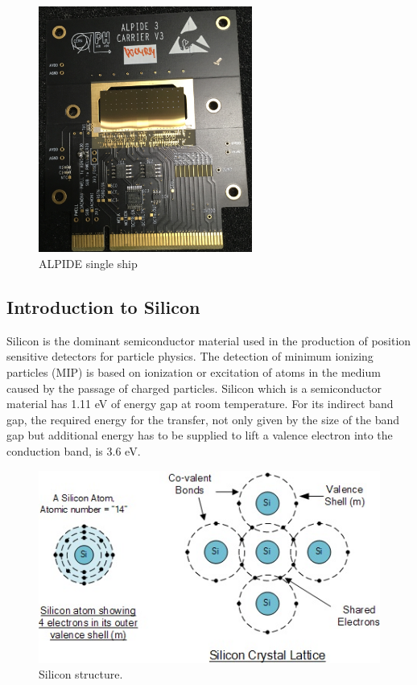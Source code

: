 \documentclass[12pt,a4paper]{article}
\begin{document}
 \begin{figure}[hbt]
\centering
  \includegraphics[width=7cm]{figure/ALPIDE3.jpg}
  \caption{ALPIDE single ship}
\end{figure}

\subsection{Introduction to Silicon}

\indent   Silicon is the dominant semiconductor material used in the production of position sensitive detectors for particle physics. The detection of minimum ionizing particles (MIP) is based on ionization or excitation of atoms in the medium caused by the passage of charged particles. Silicon which is a semiconductor material has 1.11 eV of energy gap at room temperature.  For its indirect band gap, the required energy for the transfer, not only given by the size of the band gap but additional energy has to be supplied to lift a valence electron into the conduction band, is 3.6 eV.

 \begin{figure}[hbt]
\centering
  \includegraphics[width=12cm]{figure/diode1.jpg}
  \caption{Silicon structure\cite{Dragicevic:2010xca}.}
\end{figure}
\end{document}
